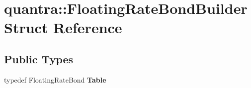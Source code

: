 \hypertarget{structquantra_1_1FloatingRateBondBuilder}{}\section{quantra\+:\+:Floating\+Rate\+Bond\+Builder Struct Reference}
\label{structquantra_1_1FloatingRateBondBuilder}
\subsection*{Public Types}
\begin{DoxyCompactItemize}
\item 
\mbox{\label{structquantra_1_1FloatingRateBondBuilder_a7af2b364ca0034ad984c46566932d041}} 
typedef Floating\+Rate\+Bond {\bfseries Table}
\end{DoxyCompactItemize}
